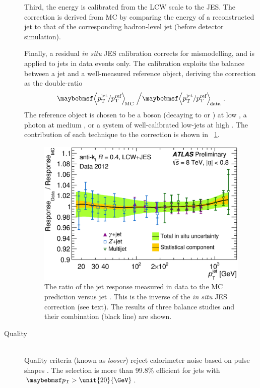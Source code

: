 \begin{description}
	Third, the energy is calibrated from the LCW scale to the JES. The correction is 
	derived from MC by comparing the energy of a reconstructed jet to that of the 
	corresponding hadron-level jet (\ie before detector simulation).

	Finally, a residual \textit{in situ} JES calibration corrects for mismodelling, 
	and is applied to jets in data events only. The calibration exploits the \pt 
	balance between a jet and a well-measured reference object, deriving the correction 
	as the double-ratio
	\begin{equation}
		\angles{p_{\text{T}}^{\text{jet}} / p_{\text{T}}^{\text{ref}}}_{\text{\!MC}} 
		\,\, \Big/ 
		\angles{p_{\text{T}}^{\text{jet}} / p_{\text{T}}^{\text{ref}}}_{\text{\!data}} 
		\,\,.
	\end{equation}
	The reference object is chosen to be a \PZ boson (decaying to \epluseminus or 
	\HepProcess{\APmuon\Pmuon}) at low \pt, a photon at medium \pt, or a system of 
	well-calibrated low-\pt jets at high \pt. The contribution of each technique to 
	the correction is shown in \Figure~\ref{fig:objects:jet_insitu}.

	\begin{figure}
		\includegraphics[width=\mediumfigwidth]{tex/selection/jet_insitu_corr}
		\caption{The ratio of the jet response measured in data to the MC prediction 
		versus jet \pt \cite{Jets:JES:2012}. This is the inverse of the \textit{in situ} 
		JES correction (see text). The results of three \pt balance studies and their 
		combination (black line) are shown.}
		\label{fig:objects:jet_insitu}
	\end{figure}

\item[Quality] \hfill \\
	Quality criteria (known as \textit{looser}) reject calorimeter noise based on 
	pulse shapes \cite{Jets:Quality:2011}. The selection is more than 99.8\% efficient 
	for jets with $\pt > \unit{20}{\GeV}$.


\end{description}
